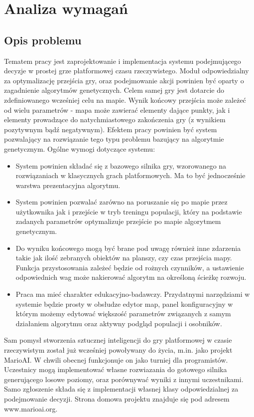 \section{Analiza wymagań}
\subsection{Opis problemu}
\begin{par}
	Tematem pracy jest zaprojektowanie i implementacja systemu podejmującego decyzje w prostej grze platformowej czasu rzeczywistego.
	Moduł odpowiedzialny za optymalizację przejścia gry, oraz podejmowanie akcji powinien być oparty o zagadnienie algorytmów genetycznych.
	Celem samej gry jest dotarcie do zdefiniowanego wcześniej celu na mapie. Wynik końcowy przejścia może zależeć od wielu parametrów - mapa może zawierać elementy dające punkty, jak i elementy prowadzące do natychmiastowego zakończenia gry (z wynikiem pozytywnym bądź negatywnym).
	Efektem pracy powinien być system pozwalający na rozwiązanie tego typu problemu bazujący na algorytmie genetycznym.
	\newline
	Ogólne wymogi dotyczące systemu:
	\begin{itemize}
		\item
			System powinien składać się z bazowego silnika gry, wzorowanego na rozwiązaniach w klasycznych grach platformowych. Ma to być jednocześnie warstwa prezentacyjna algorytmu.
		\item
			System powinien pozwalać zarówno na poruszanie się po mapie przez użytkownika jak i przejście w tryb treningu populacji, który na podstawie zadanych parametrów optymalizuje przejście po mapie algorytmem genetycznym.
		\item
			Do wyniku końcowego mogą być brane pod uwagę również inne zdarzenia takie jak ilość zebranych obiektów na planszy, czy czas przejścia mapy.
			Funkcja przystosowania zależeć będzie od rożnych czynników, a ustawienie odpowiednich wag może nakierować algorytm na określoną ścieżkę rozwoju.
		\item
			Praca ma mieć charakter edukacyjno-badawczy. Przydatnymi narzędziami w systemie będzie prosty w obsłudze edytor map, panel konfiguracyjny w którym możemy edytować większość parametrów związanych z samym działaniem algorytmu oraz aktywny podgląd populacji i osobników.
	\end{itemize}
\end{par}

\begin{par}
	Sam pomysł stworzenia sztucznej inteligencji do gry platformowej w czasie rzeczywistym został już wcześniej powoływany do życia, m.in. jako projekt MarioAI. 
	W chwili obecnej funkcjonuje on jako turniej dla programistów. 
	Uczestnicy mogą implementować własne rozwiazania do gotowego silnika generującego losowe poziomy, oraz porównywać wyniki z innymi uczestnikami.
	Samo zgłoszenie składa się z implementacji własnej klasy odpowiedzialnej za podejmowanie decyzji.
	Strona domowa projektu znajduje się pod adresem www.marioai.org.
\end{par}



